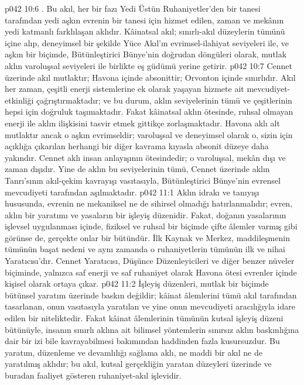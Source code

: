 \vs p042 10:6 . Bu akıl, her bir fazı Yedi Üstün Ruhaniyetler’den bir tanesi tarafından yedi aşkın evrenin bir tanesi için hizmet edilen, zaman ve mekânın yedi katmanlı farklılaşan aklıdır. Kâinatsal akıl; sınırlı\hyp{}akıl düzeylerin tümünü içine alıp, deneyimsel bir şekilde Yüce Akıl’ın evrimsel\hyp{}ilahiyat seviyeleri ile, ve aşkın bir biçimde, Bütünleştirici Bünye’nin doğrudan döngüleri olarak, mutlak aklın varoluşsal seviyeleri ile birlikte eş güdümü yerine getirir.
\vs p042 10:7 Cennet üzerinde akıl mutlaktır; Havona içinde absonittir; Orvonton içinde sınırlıdır. Akıl her zaman, çeşitli enerji sistemlerine ek olarak yaşayan hizmete ait mevcudiyet\hyp{}etkinliği çağrıştırmaktadır; ve bu durum, aklın seviyelerinin tümü ve çeşitlerinin hepsi için doğruluk taşımaktadır. Fakat kâinatsal aklın ötesinde, ruhsal olmayan enerji ile aklın ilişkisini tasvir etmek gittikçe zorlaşmaktadır. Havona aklı alt mutlaktır ancak o aşkın evrimseldir; varoluşsal ve deneyimsel olarak o, sizin için açıklığa çıkarılan herhangi bir diğer kavrama kıyasla absonit düzeye daha yakındır. Cennet aklı insan anlayışının ötesindedir; o varoluşsal, mekân dışı ve zaman dışıdır. Yine de aklın bu seviyelerinin tümü, Cennet üzerinde aklın Tanrı’sının akıl\hyp{}çekim kavrayışı vasıtasıyla, Bütünleştirici Bünye’nin evrensel mevcudiyeti tarafından aşılmaktadır.
\vs p042 11:1 Aklın idrakı ve tanıyışı hususunda, evrenin ne mekaniksel ne de sihirsel olmadığı hatırlanmalıdır; evren, aklın bir yaratımı ve yasaların bir işleyiş düzenidir. Fakat, doğanın yasalarının işlevsel uygulanması içinde, fiziksel ve ruhsal bir biçimde çifte âlemler varmış gibi görünse de, gerçekte onlar bir bütündür. İlk Kaynak ve Merkez, maddileşmenin tümünün başat nedeni ve aynı zamanda o ruhaniyetlerin tümünün ilk ve nihai Yaratıcısı’dır. Cennet Yaratıcısı, Düşünce Düzenleyicileri ve diğer benzer nüveler biçiminde, yalnızca saf enerji ve saf ruhaniyet olarak Havona ötesi evrenler içinde kişisel olarak ortaya çıkar.
\vs p042 11:2 İşleyiş düzenleri, mutlak bir biçimde bütünsel yaratım üzerinde baskın değildir; kâinat âlemlerini tümü  akıl tarafından tasarlanan, onun vasıtasıyla yaratılan ve yine onun mevcudiyeti aracılığıyla idare edilen bir niteliktedir. Fakat kâinat âlemlerinin tümünün kutsal işleyiş düzeni bütünüyle, insanın sınırlı aklına ait bilimsel yöntemlerin sınırsız aklın baskınlığına dair bir izi bile kavrayabilmesi bakımından haddinden fazla kusursuzdur. Bu yaratım, düzenleme ve devamlılığı sağlama aklı, ne maddi bir akıl ne de yaratılmış aklıdır; bu akıl, kutsal gerçekliğin yaratan düzeyleri üzerinde ve buradan faaliyet gösteren ruhaniyet\hyp{}akıl işlevidir.
